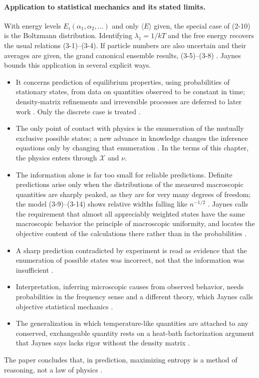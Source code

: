 \paragraph{Application to statistical mechanics and its stated limits.}
With energy levels \(E_i(\alpha_1,\alpha_2,\ldots)\) and only \(\langle E\rangle\)
given, the special case of (2-10) is the Boltzmann distribution. Identifying
\(\lambda_1=1/kT\) and the free energy recovers the usual relations (3-1)--(3-4).
If particle numbers are also uncertain and their averages are given, the
grand canonical ensemble results, (3-5)--(3-8) \cite[pp.~623--624]{Jaynes1957InformationTheory}.
Jaynes bounds this application in several explicit ways.
\begin{itemize}
\item It concerns prediction of equilibrium properties, using probabilities of
stationary states, from data on quantities observed to be constant in time;
density-matrix refinements and irreversible processes are deferred to later
work \cite[p.~621; p.~624]{Jaynes1957InformationTheory}. Only the discrete
case is treated \cite[p.~622, n.~6]{Jaynes1957InformationTheory}.
\item The only point of contact with physics is the enumeration of the
mutually exclusive possible states; a new advance in knowledge changes the
inference equations only by changing that enumeration
\cite[p.~625]{Jaynes1957InformationTheory}. In the terms of this chapter, the
physics enters through \(\mathcal X\) and \(\nu\).
\item The information alone is far too small for reliable predictions. Definite
predictions arise only when the distributions of the measured macroscopic
quantities are sharply peaked, as they are for very many degrees of freedom; the
model (3-9)--(3-14) shows relative widths falling like \(n^{-1/2}\)
\cite[pp.~625--626]{Jaynes1957InformationTheory}. Jaynes calls the requirement
that almost all appreciably weighted states have the same macroscopic behavior
the principle of macroscopic uniformity, and locates the objective content of
the calculations there rather than in the probabilities
\cite[p.~627]{Jaynes1957InformationTheory}.
\item A sharp prediction contradicted by experiment is read as evidence that the
enumeration of possible states was incorrect, not that the information was
insufficient \cite[p.~627]{Jaynes1957InformationTheory}.
\item Interpretation, inferring microscopic causes from observed behavior, needs
probabilities in the frequency sense and a different theory, which Jaynes calls
objective statistical mechanics \cite[p.~627]{Jaynes1957InformationTheory}.
\item The generalization in which temperature-like quantities are attached to any
conserved, exchangeable quantity rests on a heat-bath factorization argument that
Jaynes says lacks rigor without the density matrix
\cite[pp.~627--628, n.~18]{Jaynes1957InformationTheory}.
\end{itemize}
The paper concludes that, in prediction, maximizing entropy is a method of
reasoning, not a law of physics \cite[p.~630]{Jaynes1957InformationTheory}.


